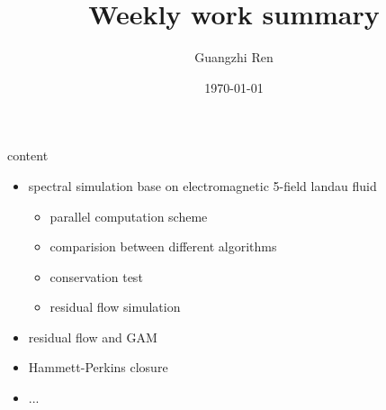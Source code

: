 \documentclass{beamer}
\title{Weekly work summary}
\author{Guangzhi Ren}
\institute {}
\date{\today}
\begin{document}
	
\begin{frame}
	\titlepage   
\end{frame}


\begin{frame}{content}
\begin{itemize}
	\item spectral simulation base on electromagnetic 5-field landau fluid
		\begin{itemize}
			\item parallel computation scheme
			\item comparision between different algorithms
			\item conservation test
			\item residual flow simulation
		\end{itemize}
	\item residual flow and GAM
	\item Hammett-Perkins closure 
	\item ...	
\end{itemize}
\end{frame}
\end{document}
